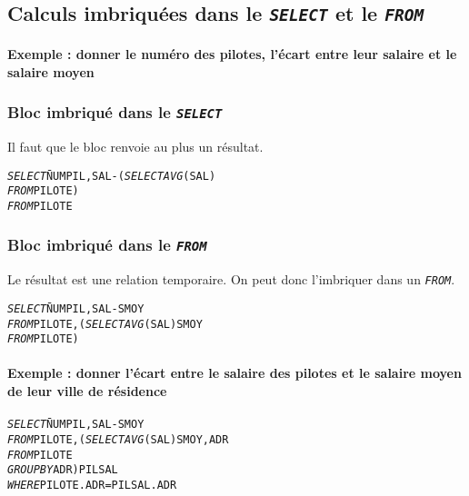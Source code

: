 \documentclass[10pt]{article}
\begin{document}
		\subsection{Calculs imbriquées dans le \emph{\texttt{SELECT}} et le \emph{\texttt{FROM}}}
			\paragraph{Exemple : donner le numéro des pilotes, l'écart entre leur salaire et le salaire moyen}
			\subsubsection{Bloc imbriqué dans le \emph{\texttt{SELECT}}}
				Il faut que le bloc renvoie au plus un résultat.
				\begin{alltt}
					\begin{tabbing}
						\emph{SELECT}\= NUMPIL,SAL-(\=\emph{SELECT}\=\emph{AVG}(SAL)\=\\
												\>\>\emph{FROM} \>PILOTE\>)\\
						\emph{FROM}\> PILOTE
					\end{tabbing}
				\end{alltt}
				
			\subsubsection{Bloc imbriqué dans le \emph{\texttt{FROM}}}
				Le résultat est une relation temporaire. On peut donc l'imbriquer dans un \emph{\texttt{FROM}}.
				
				\begin{alltt}
					\begin{tabbing}
						\emph{SELECT}\= NUMPIL, SAL-SMOY\\
						\emph{FROM}\> PILOTE, (\=\emph{SELECT}\= \emph{AVG}(SAL) SMOY\=\\
												\>\>\emph{FROM} \>PILOTE\>)\\
					\end{tabbing}
				\end{alltt}
				
				\paragraph{Exemple : donner l'écart entre le salaire des pilotes et le salaire moyen de leur ville de résidence}
					\begin{alltt}
						\begin{tabbing}
							\emph{SELECT}\= NUMPIL, SAL-SMOY\\
							\emph{FROM}\> PILOTE, (\=\emph{SELECT}\= \emph{AVG}(SAL) SMOY,ADR\=\\
													\>\>\emph{FROM} \>PILOTE\\
													\>\>\emph{GROUP BY} ADR\>\>) PILSAL\\
							\emph{WHERE}\> PILOTE.ADR=PILSAL.ADR
						\end{tabbing}
					\end{alltt}
					
\end{document}
